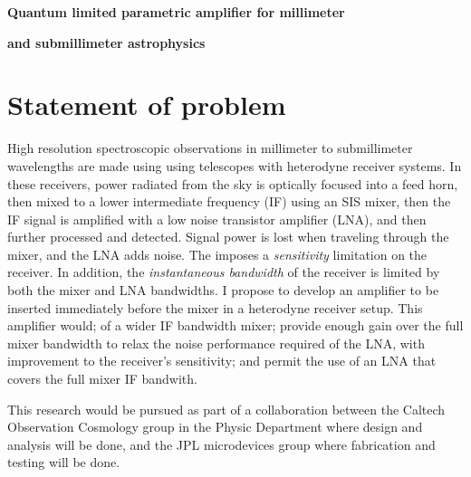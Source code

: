 






\centerline{\textbf{Quantum limited parametric amplifier for millimeter}}
\centerline{\textbf{and submillimeter astrophysics}}


\section{Statement of problem}
High resolution spectroscopic observations in millimeter to submillimeter wavelengths are made using using telescopes with heterodyne receiver systems. In these receivers, power radiated from the sky is optically focused into a feed horn, then mixed to a lower intermediate frequency (IF) using an SIS mixer, then the IF signal is amplified with a low noise transistor amplifier (LNA), and then further processed and detected. Signal power is lost when traveling through the mixer, and the LNA adds noise. The imposes a \emph{sensitivity} limitation on the receiver.  In addition, the \emph{instantaneous bandwidth} of the receiver is limited by both the mixer and LNA bandwidths. I propose to develop an amplifier to be inserted immediately before the mixer in a heterodyne receiver setup. This amplifier would; of a wider IF bandwidth mixer; provide enough gain over the full mixer bandwidth to relax the noise performance required of the LNA, with improvement to the receiver's sensitivity; and permit the use of an LNA that covers the full mixer IF bandwith.

This research would be pursued as part of a collaboration between the Caltech Observation Cosmology group in the Physic Department where design and analysis will be done, and the JPL microdevices group where fabrication and testing will be done.
   

